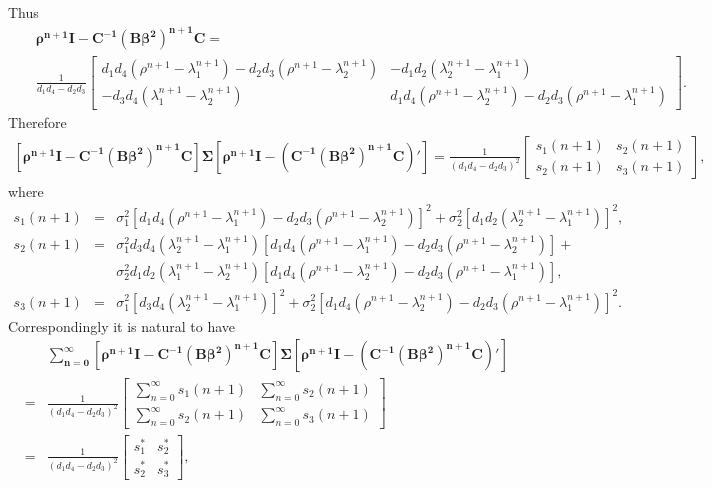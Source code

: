 \begin{appendix}
Thus
\begin{eqnarray*}
&&\pmb{\rho^{n+1}I-C^{-1}(B\beta^2)^{n+1}C}=
\\
&&\frac{1}{d_1d_4-d_2d_3}\left[\begin{array}{cc}
d_1d_4(\rho^{n+1}-\lambda_1^{n+1})-d_2d_3(\rho^{n+1}-\lambda_2^{n+1})&-d_1d_2(\lambda_2^{n+1}-\lambda_1^{n+1})\\
-d_3d_4(\lambda_1^{n+1}-\lambda_2^{n+1})&d_1d_4(\rho^{n+1}-\lambda_2^{n+1})-d_2d_3(\rho^{n+1}-\lambda_1^{n+1})
\end{array}\right].
\end{eqnarray*}
Therefore
\begin{eqnarray*}
\pmb{[\rho^{n+1}I-C^{-1}(B\beta^2)^{n+1}C]\Sigma[\rho^{n+1}I-(C^{-1}(B\beta^2)^{n+1}C)']}
=\frac{1}{(d_1d_4-d_2d_3)^2}\left[\begin{array}{cc}
s_1(n+1)&s_2(n+1)\\
s_2(n+1)&s_3(n+1)
\end{array}\right],
\end{eqnarray*}
where
\begin{eqnarray*}
s_1(n+1)&=&\sigma_1^2[d_1d_4(\rho^{n+1}-\lambda_1^{n+1})-d_2d_3(\rho^{n+1}-\lambda_2^{n+1})]^2+\sigma_2^2[d_1d_2(\lambda_2^{n+1}-\lambda_1^{n+1})]^2,\\
s_2(n+1)&=&\sigma_1^2d_3d_4(\lambda_2^{n+1}-\lambda_1^{n+1})[d_1d_4(\rho^{n+1}-\lambda_1^{n+1})-d_2d_3(\rho^{n+1}-\lambda_2^{n+1})]+\\
&&\sigma_2^2d_1d_2(\lambda_1^{n+1}-\lambda_2^{n+1})[d_1d_4(\rho^{n+1}-\lambda_2^{n+1})-d_2d_3(\rho^{n+1}-\lambda_1^{n+1})],\\
s_3(n+1)&=&\sigma_1^2[d_3d_4(\lambda_2^{n+1}-\lambda_1^{n+1})]^2+\sigma_2^2[d_1d_4(\rho^{n+1}-\lambda_2^{n+1})-d_2d_3(\rho^{n+1}-\lambda_1^{n+1})]^2.
\end{eqnarray*}
Correspondingly it is natural to have
\begin{eqnarray}
&&\pmb{\sum_{n=0}^\infty{[\rho^{n+1}I-C^{-1}(B\beta^2)^{n+1}C]\Sigma[\rho^{n+1}I-(C^{-1}(B\beta^2)^{n+1}C)']}}\nonumber\\
&=&\frac{1}{(d_1d_4-d_2d_3)^2}\left[\begin{array}{cc}
\sum_{n=0}^\infty s_1(n+1)&\sum_{n=0}^\infty s_2(n+1)\\
\sum_{n=0}^\infty s_2(n+1)&\sum_{n=0}^\infty s_3(n+1)
\end{array}\right]\nonumber\\
&=&\frac{1}{(d_1d_4-d_2d_3)^2}\left[\begin{array}{cc}
s_1^*&s_2^*\\
s_2^*&s_3^*
\end{array}\right],\label{varzps}
\end{eqnarray}


\end{appendix}
